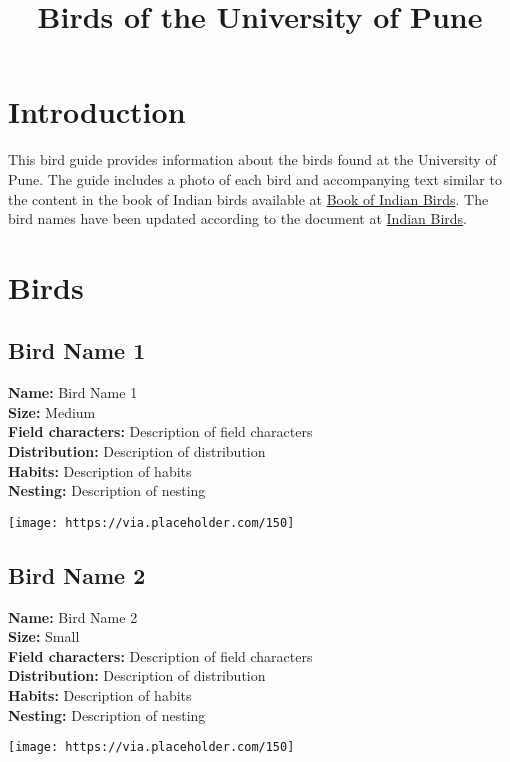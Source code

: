 \documentclass[a5paper,12pt]{memoir}
\title{Birds of the University of Pune}
\author{}
\date{}
\begin{document}
\maketitle

\tableofcontents

\chapter*{Introduction}
This bird guide provides information about the birds found at the University of Pune. The guide includes a photo of each bird and accompanying text similar to the content in the book of Indian birds available at \href{https://archive.org/download/BookOfIndianBirds/BookIndianBirds.pdf}{Book of Indian Birds}. The bird names have been updated according to the document at \href{https://indianbirds.in/pdfs/IB_11_5_6_Final.pdf}{Indian Birds}.

\chapter{Birds}

\section*{Bird Name 1}
\textbf{Name:} Bird Name 1 \\
\textbf{Size:} Medium \\
\textbf{Field characters:} Description of field characters \\
\textbf{Distribution:} Description of distribution \\
\textbf{Habits:} Description of habits \\
\textbf{Nesting:} Description of nesting \\
\begin{flushright}
\texttt{[image: https://via.placeholder.com/150]}
\end{flushright}

\newpage

\section*{Bird Name 2}
\textbf{Name:} Bird Name 2 \\
\textbf{Size:} Small \\
\textbf{Field characters:} Description of field characters \\
\textbf{Distribution:} Description of distribution \\
\textbf{Habits:} Description of habits \\
\textbf{Nesting:} Description of nesting \\
\begin{flushright}
\texttt{[image: https://via.placeholder.com/150]}
\end{flushright}

\newpage

\end{document}
